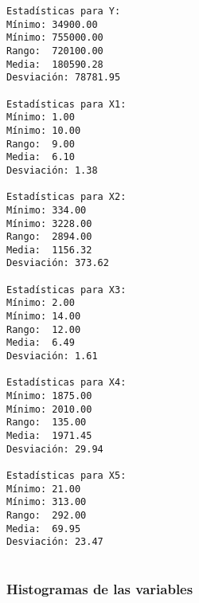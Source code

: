 \documentclass[11pt]{article}
\begin{document}
    \begin{Verbatim}[commandchars=\\\{\}]
Estadísticas para Y:
Mínimo:	34900.00
Mínimo:	755000.00
Rango:	720100.00
Media:	180590.28
Desviación:	78781.95

Estadísticas para X1:
Mínimo:	1.00
Mínimo:	10.00
Rango:	9.00
Media:	6.10
Desviación:	1.38

Estadísticas para X2:
Mínimo:	334.00
Mínimo:	3228.00
Rango:	2894.00
Media:	1156.32
Desviación:	373.62

Estadísticas para X3:
Mínimo:	2.00
Mínimo:	14.00
Rango:	12.00
Media:	6.49
Desviación:	1.61

Estadísticas para X4:
Mínimo:	1875.00
Mínimo:	2010.00
Rango:	135.00
Media:	1971.45
Desviación:	29.94

Estadísticas para X5:
Mínimo:	21.00
Mínimo:	313.00
Rango:	292.00
Media:	69.95
Desviación:	23.47


    \end{Verbatim}

    \hypertarget{histogramas-de-las-variables}{%
\subsubsection{Histogramas de las
variables}\label{histogramas-de-las-variables}}
\end{document}
